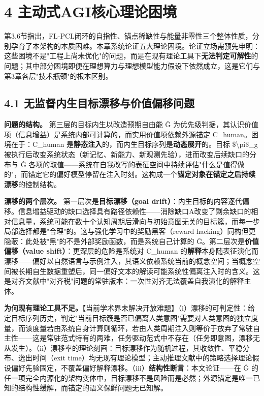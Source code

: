 \documentclass[11pt,a4paper]{ctexart}
\begin{document}
\section{4 主动式AGI核心理论困境}

第3.6节指出，FL-PCL闭环的自指性、锚点稀缺性与能量非零性三个整体性质，分别孕育了本架构的本质困难。本章系统论证五大理论困境。论证立场需预先申明：这些困境不是"工程上尚未优化"的问题，而是在现有理论工具下\textbf{无法判定可解性}的问题；其中部分困境即便在理想算力与理想模型能力假设下依然成立，这是它们与第3章各层"技术瓶颈"的根本区别。

\subsection{4.1 无监督内生目标漂移与价值偏移问题}

\textbf{问题的结构。} 第三层的目标内生以改造预期自由能 Ĝ 为优先级判据，其认识价值项（信息增益）是系统内部可计算的，而实用价值项依赖外源锚定 C\_human。困境在于：C\_human 是\textbf{静态注入}的，而内生目标序列是\textbf{动态展开}的。目标 \$\textbackslash{}pi\$\_g 被执行后改变系统状态（新记忆、新能力、新观测先验），进而改变后续缺口的分布与 Ĝ 各项的取值——系统在自我改写的表征空间中持续评估"什么是值得做的"，而锚定它的偏好模型停留在注入时刻。这构成一个\textbf{锚定对象在锚定之后持续漂移}的控制结构。

\textbf{漂移的两个层次。} 第一层次是\textbf{目标漂移（goal drift）}：内生目标的内容逐代偏移。信息增益驱动的缺口选择具有路径依赖性——消除缺口A改变了剩余缺口的相对信息量，系统可能在数十个认知周期后滑向与初始意图无关的目标簇，而每一步局部选择都是"合理"的。这与强化学习中的奖励黑客（reward hacking）同构但更隐蔽：此处被"黑"的不是外部奖励函数，而是系统自己计算的 Ĝ。第二层次是\textbf{价值偏移（value shift）}：更深层的危险是系统对 C\_human 的\textbf{解释}本身随表征演化而漂移——偏好以自然语言与示例注入，其语义依赖系统当前的概念空间；当概念空间被长期自生数据重塑后，同一偏好文本的解读可能系统性偏离注入时的含义。这是对齐文献中"对齐税"问题的常驻版本：一次性对齐无法覆盖自我演化的解释主体。

\textbf{为何现有理论工具不足。}【当前学术界未解决开放难题】（i）漂移的可判定性：给定目标序列历史，判定"当前目标簇是否已偏离人类意图"需要对人类意图的独立度量，而该度量若由系统自身计算则循环，若由人类周期注入则等价于放弃了常驻自主性——这是常驻范式特有的两难，任务驱动范式中不存在（任务即意图，漂移无从发生）。（ii）漂移率的理论刻画：目标漂移作为随机过程，其收敛性、平稳分布、逸出时间（exit time）均无现有理论模型；主动推理文献中的策略选择理论假设偏好先验固定，不覆盖偏好解释漂移。（iii）\textbf{结构性断言}：本文论证——在 Ĝ 的任一项完全内源化的架构变体中，目标漂移不是风险而是必然；外源锚定是唯一已知的结构性缓解，而锚定的语义保鲜问题无已知解。
\end{document}
